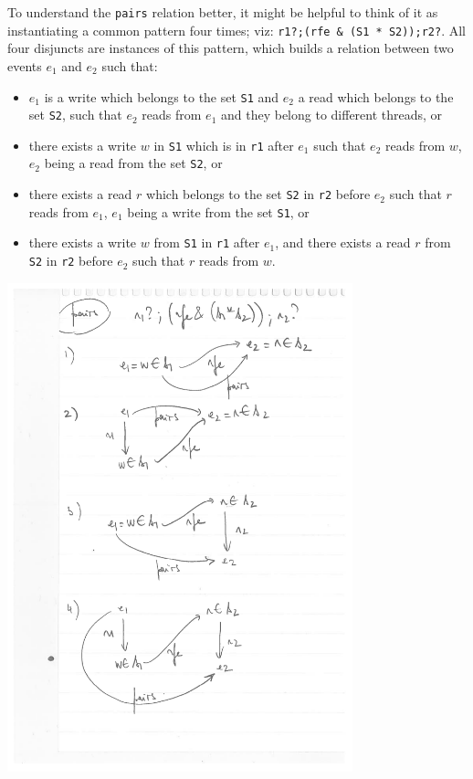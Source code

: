 \documentclass[a4paper]{article}
\begin{document}
\noindent To understand the {\tt pairs} relation better, it might be helpful to
think of it as instantiating a common pattern four times; viz:  {\tt r1?;(rfe \& (S1 * S2));r2?}. All four
disjuncts are instances of this pattern, which builds a relation between two
events $e_1$ and $e_2$ such that:
\begin{itemize}
\item $e_1$ is a write which belongs to the set {\tt S1} and $e_2$ a read which
belongs to the set {\tt S2}, such that $e_2$ reads from $e_1$ and they belong
to different threads, or
\item there exists a write $w$ in {\tt S1} which is in {\tt r1} after $e_1$
such that $e_2$ reads from $w$, $e_2$ being a read from the set {\tt S2}, or
\item there exists a read $r$ which belongs to the set {\tt S2} in {\tt r2}
before $e_2$ such that $r$ reads from $e_1$, $e_1$ being a write from the set
{\tt S1}, or
\item there exists a write $w$ from {\tt S1} in {\tt r1} after $e_1$, and there
exists a read $r$ from {\tt S2} in {\tt r2} before $e_2$ such that $r$ reads
from $w$.
\end{itemize}

\includegraphics[width=10cm]{pairs1}
\end{document}

